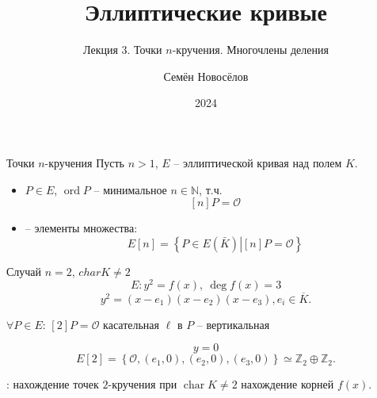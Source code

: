 \documentclass{beamer}
\title{Эллиптические кривые}
\subtitle{Лекция 3. Точки $n$-кручения. Многочлены деления}
\author{Семён Новосёлов}
\institute{БФУ им. И. Канта}
\date{2024}
\begin{document}
\frame{\titlepage}

\begin{frame}{Точки $n$-кручения}
Пусть $n > 1$, $E$ -- эллиптической кривая над полем $K$.
\begin{itemize}
    \item {} $P \in E$, $\operatorname{ord} P$ -- минимальное $n \in \mathbb{N}$, т.ч.
    \[
    [n] P = \mathcal{O}
    \]
    \item {} -- элементы множества:
    \[
    E[n] = \left\{ {\left. P \in E(\bar K)\right| [n]P = \mathcal{O}} \right\}
    \]
\end{itemize}
\end{frame}


\begin{frame}{Случай $n=2$, $charK \ne 2$}
\[
E: {y^2} = f(x), ~ \deg f\left( x \right) = 3
\]
\structure{\[\Downarrow\]}
\[
y^2 = \left( {x - {e_1}} \right)\left( {x - {e_2}} \right)\left( {x - {e_3}} \right), e_i \in \overline{K}.
\]
\begin{center}
$\forall P \in E$: $[2] P = \mathcal{O}$ \structure{$\Leftrightarrow$} касательная $\ell$ в $P$ -- вертикальная
\end{center}
\structure{\[\Downarrow\]}
\[
y = 0
\]
\structure{\[\Downarrow\]}
\[
E[2] = \left\{ \mathcal{O}, (e_1, 0), (e_2 ,0), (e_3,0) \right\} \simeq \mathbb{Z}_2 \oplus \mathbb{Z}_2.
\]
    
: нахождение точек $2$-кручения при $\operatorname{char}K \ne 2$ \structure{$\Leftrightarrow$} нахождение корней $f(x)$.
\end{frame}
\end{document}
